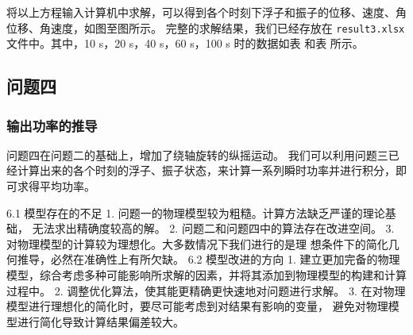 将以上方程输入计算机中求解，可以得到各个时刻下浮子和振子的位移、速度、角位移、角速度，如图至图所示。
完整的求解结果，我们已经存放在 \verb|result3.xlsx|文件中。其中，10 s，20 s，40 s，60 s，100 s 时的数据如表 和表 所示。

\subsection{问题四}

\subsubsection{输出功率的推导}

问题四在问题二的基础上，增加了绕轴旋转的纵摇运动。
我们可以利用问题三已经计算出来的各个时刻的浮子、振子状态，来计算一系列瞬时功率并进行积分，即可求得平均功率。



6.1 模型存在的不足
1. 问题一的物理模型较为粗糙。计算方法缺乏严谨的理论基础，
无法求出精确度较高的解。
2. 问题二和问题四中的算法存在改进空间。
3. 对物理模型的计算较为理想化。大多数情况下我们进行的是理
想条件下的简化几何推导，必然在准确性上有所欠缺。
6.2 模型改进的方向
1. 建立更加完备的物理模型，综合考虑多种可能影响所求解的因素，并将其添加到物理模型的构建和计算过程中。
2. 调整优化算法，使其能更精确更快速地对问题进行求解。
3. 在对物理模型进行理想化的简化时，要尽可能考虑到对结果有影响的变量，
避免对物理模型进行简化导致计算结果偏差较大。